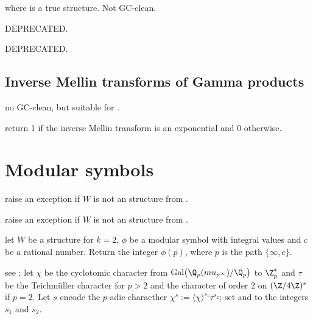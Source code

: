  where
 is a true  structure. Not GC-clean.


 DEPRECATED.

 DEPRECATED.

\section{Inverse Mellin transforms of Gamma products}



 no GC-clean, but
suitable for .

 return 1 if the inverse Mellin transform is
an exponential and 0 otherwise.



\newpage

\chapter{Modular symbols}

 raise an exception if $W$ is not an 
structure from .

 raise an exception if $W$ is not an
 structure from .

 let $W$ be a 
structure for $k = 2$, $\phi$ be a modular symbol with integral values
and $c$ be a rational number. Return the integer $\phi(p)$,
where $p$ is the path $\{\infty,c\}$.

 see ;
let $\chi$ be the  cyclotomic  character from
$\text{Gal}\big(\Q_p(mu_{p^\infty})/\Q_p\big)$ to $\Z_p^*$
and $\tau$ be the Teichm\"uller character for $p > 2$ and the character of
order $2$ on $(\Z/4\Z)^*$ if $p = 2$. Let $s$ encode
the $p$-adic characther $\chi^s := \langle\chi\rangle^{s_1} \tau^{s_2}$;
set  and  to the integers $s_1$ and $s_2$.

